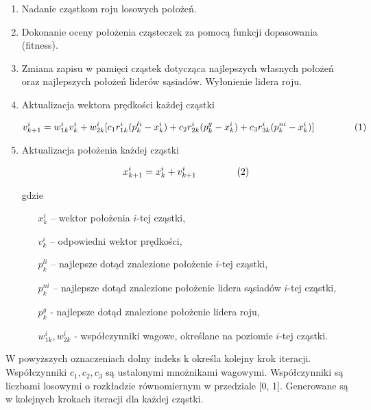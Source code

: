 \documentclass{llncs}
\begin{document}
\begin{enumerate}
\item Nadanie cząstkom roju losowych położeń.
\item Dokonanie oceny położenia cząsteczek za pomocą funkcji dopasowania (fitness).
\item Zmiana zapisu w pamięci cząstek dotycząca najlepszych własnych położeń oraz najlepszych położeń liderów sąsiadów. Wyłonienie lidera roju.
\item Aktualizacja wektora prędkości każdej cząstki

\begin{displaymath}
v_{k+1}^i = w_{1k}^i v_{k}^i + w_{2k}^i[c_{1} r_{1k}^i(p_{k}^{li} - x_{k}^i) + c_{2} r_{2k}^i(p_{k}^{g} - x_{k}^i) + c_{3} r_{3k}^i(p_{k}^{ni} - x_{k}^i)] \hspace{15mm} (1)
\end{displaymath}

\item Aktualizacja położenia każdej cząstki

\begin{displaymath}
x_{k+1}^i = x_{k}^i + v_{k+1}^i \hspace{15mm} (2)
\end{displaymath}

gdzie

\begin{itemize}
\item[$x_{k}^i$] -- wektor położenia $i$-tej cząstki,
\item[$v_{k}^i$] -- odpowiedni wektor prędkości,
\item[$p_{k}^{li}$] -- najlepsze dotąd znalezione położenie $i$-tej cząstki,
\item[$p_{k}^{ni}$] -- najlepsze dotąd znalezione położenie lidera sąsiadów $i$-tej cząstki,
\item[$p_{k}^g$] - najlepsze dotąd znalezione położenie lidera roju,
\item[$w_{1k}^i, w_{2k}^i$] - współczynniki wagowe, określane na poziomie $i$-tej cząstki.
\end{itemize}
\end{enumerate}

W powyższych oznaczeniach dolny indeks k określa kolejny krok iteracji. Współczynniki $c_{1}, c_{2}, c_{3}$ są ustalonymi mnożnikami wagowymi. Współczynniki  są liczbami losowymi o rozkładzie równomiernym w przedziale [0, 1]. Generowane są w kolejnych krokach iteracji dla każdej cząstki.\\
\end{document}
